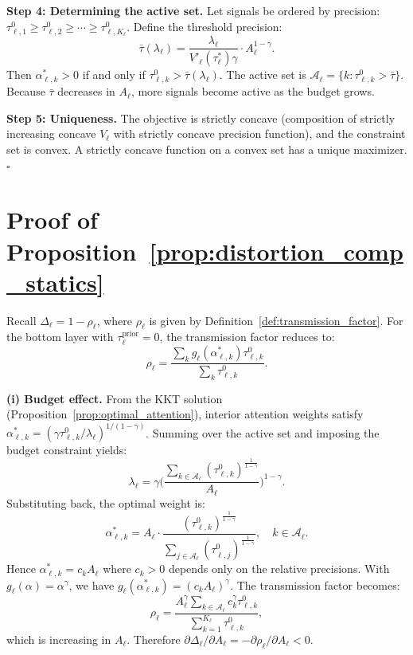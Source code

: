 \textbf{Step 4: Determining the active set.} Let signals be ordered by precision: $\tau^0_{\ell,1} \geq \tau^0_{\ell,2} \geq \cdots \geq \tau^0_{\ell,K_\ell}$. Define the threshold precision:
\begin{equation*}
\bar{\tau}(\lambda_\ell) = \frac{\lambda_\ell}{V'_\ell(\tau^*_\ell) \gamma} \cdot A_\ell^{1-\gamma}.
\end{equation*}
Then $\alpha^*_{\ell,k} > 0$ if and only if $\tau^0_{\ell,k} > \bar{\tau}(\lambda_\ell)$. The active set is $\mathcal{A}_\ell = \{k : \tau^0_{\ell,k} > \bar{\tau}\}$. Because $\bar{\tau}$ decreases in $A_\ell$, more signals become active as the budget grows.

\textbf{Step 5: Uniqueness.} The objective is strictly concave (composition of strictly increasing concave $V_\ell$ with strictly concave precision function), and the constraint set is convex. A strictly concave function on a convex set has a unique maximizer. \hfill $\square$

\section{Proof of Proposition~\ref{prop:distortion_comp_statics}}
\label{app:proof_prop2}

Recall $\Delta_\ell = 1 - \rho_\ell$, where $\rho_\ell$ is given by Definition~\ref{def:transmission_factor}. For the bottom layer with $\tau^{\text{prior}}_\ell = 0$, the transmission factor reduces to:
\begin{equation*}
\rho_\ell = \frac{\sum_k g_\ell(\alpha^*_{\ell,k}) \tau^0_{\ell,k}}{\sum_k \tau^0_{\ell,k}}.
\end{equation*}

\textbf{(i) Budget effect.} From the KKT solution (Proposition~\ref{prop:optimal_attention}), interior attention weights satisfy $\alpha^*_{\ell,k} = (\gamma \tau^0_{\ell,k} / \lambda_\ell)^{1/(1-\gamma)}$. Summing over the active set and imposing the budget constraint yields:
\begin{equation*}
\lambda_\ell = \gamma \Biggl(\frac{\sum_{k \in \mathcal{A}_\ell} (\tau^0_{\ell,k})^{\frac{1}{1-\gamma}}}{A_\ell}\Biggr)^{1-\gamma}.
\end{equation*}
Substituting back, the optimal weight is:
\begin{equation*}
\alpha^*_{\ell,k} = A_\ell \cdot \frac{(\tau^0_{\ell,k})^{\frac{1}{1-\gamma}}}{\sum_{j \in \mathcal{A}_\ell} (\tau^0_{\ell,j})^{\frac{1}{1-\gamma}}}, \quad k \in \mathcal{A}_\ell.
\end{equation*}
Hence $\alpha^*_{\ell,k} = c_k A_\ell$ where $c_k > 0$ depends only on the relative precisions. With $g_\ell(\alpha) = \alpha^\gamma$, we have $g_\ell(\alpha^*_{\ell,k}) = (c_k A_\ell)^\gamma$. The transmission factor becomes:
\begin{equation*}
\rho_\ell = \frac{A_\ell^\gamma \sum_{k \in \mathcal{A}_\ell} c_k^\gamma \tau^0_{\ell,k}}{\sum_{k=1}^{K_\ell} \tau^0_{\ell,k}},
\end{equation*}
which is increasing in $A_\ell$. Therefore $\partial \Delta_\ell / \partial A_\ell = -\partial \rho_\ell / \partial A_\ell < 0$.

